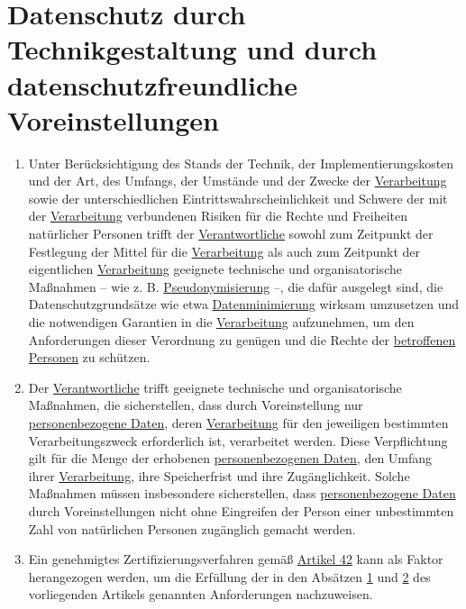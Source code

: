 \chapter{Datenschutz durch Technikgestaltung und durch datenschutzfreundliche Voreinstellungen}
\label{ch:25}


\begin{enumerate}

  \item Unter Berücksichtigung des Stands der Technik, der Implementierungskosten und der Art, des Umfangs, der Umstände
   und der Zwecke der \hyperref[itm:04-2]{Verarbeitung} sowie der unterschiedlichen Eintrittswahrscheinlichkeit und
   Schwere der mit der
   \hyperref[itm:04-2]{Verarbeitung} verbundenen Risiken für die Rechte und Freiheiten natürlicher Personen trifft
    der \hyperref[itm:04-7]{Verantwortliche} sowohl zum Zeitpunkt der Festlegung der Mittel für die \hyperref[itm:04-2]
    {Verarbeitung} als auch zum Zeitpunkt der eigentlichen
   \hyperref[itm:04-2]{Verarbeitung} geeignete technische und organisatorische Maßnahmen -- wie z. B. \hyperref
    [itm:04-5]{Pseudonymisierung} --, die dafür ausgelegt sind, die Datenschutzgrundsätze wie etwa
    \hyperref[itm:05-1c]{Datenminimierung} wirksam umzusetzen und die notwendigen Garantien in die \hyperref[itm:04-2]
     {Verarbeitung} aufzunehmen, um den Anforderungen dieser Verordnung zu genügen und die Rechte der \hyperref
     [itm:04-1]{betroffenen Personen} zu schützen.
  \label{itm:25-1}

  \item Der \hyperref[itm:04-7]{Verantwortliche} trifft geeignete technische und organisatorische Maßnahmen, die
   sicherstellen, dass durch Voreinstellung nur \hyperref[itm:04-1]{personenbezogene Daten},
   deren \hyperref[itm:04-2]{Verarbeitung} für den jeweiligen bestimmten Verarbeitungszweck erforderlich ist,
   verarbeitet werden. Diese Verpflichtung gilt für die Menge der erhobenen
   \hyperref[itm:04-1]{personenbezogenen Daten}, den Umfang ihrer \hyperref[itm:04-2]{Verarbeitung}, ihre Speicherfrist
    und ihre Zugänglichkeit. Solche Maßnahmen müssen insbesondere sicherstellen, dass \hyperref[itm:04-1]
    {personenbezogene Daten} durch Voreinstellungen nicht ohne Eingreifen der Person einer unbestimmten Zahl von
    natürlichen Personen zugänglich gemacht werden.
  \label{itm:25-2}

  \item Ein genehmigtes Zertifizierungsverfahren gemäß \hyperref[ch:42]{Artikel 42} kann als Faktor herangezogen werden,
   um die Erfüllung der in den Absätzen \hyperref[itm:25-1]{1} und \hyperref[itm:25-2]{2} des vorliegenden Artikels
   genannten Anforderungen nachzuweisen.
  \label{itm:25-3}

\end{enumerate}


